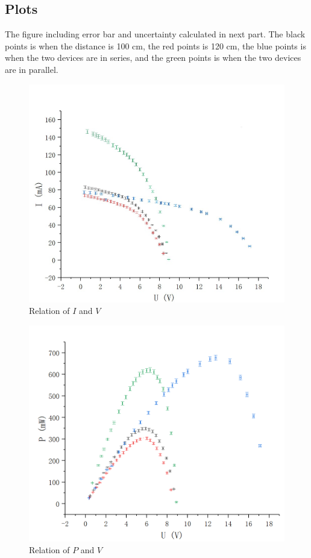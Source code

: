 \documentclass[12pt]{article}
\begin{document}
\subsection{Plots}
The figure including error bar and uncertainty calculated in next part. The black points is when the distance is 100 cm, the red points is 120 cm, the blue points is when the two devices are in series, and the green points is when the two devices are in parallel.
\begin{figure}[H]
\centering
\includegraphics[scale=0.4]{P4.jpg}
\caption{Relation of $I$ and $V$}
\end{figure}
\begin{figure}[H]
\centering
\includegraphics[scale=0.3]{P5.jpg}
\caption{Relation of $P$ and $V$}
\end{figure}
\end{document}
